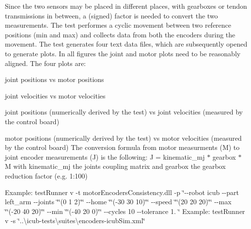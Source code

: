 Since the two sensors may be placed in different places, with gearboxes or tendon transmissions in between, a (signed) factor is needed to convert the two measurements. The test performes a cyclic movement between two reference positions (min and max) and collects data from both the encoders during the movement. The test generates four text data files, which are subsequently opened to generate plots. In all figures the joint and motor plots need to be reasonably aligned. The four plots are\+: \begin{DoxyItemize}
\item joint positions vs motor positions \item joint velocities vs motor velocities \item joint positions (numerically derived by the test) vs joint velocities (measured by the control board) \item motor positions (numerically derived by the test) vs motor velocities (measured by the control board) The conversion formula from motor measurments (M) to joint encoder measurements (J) is the following\+: J = kinematic\+\_\+mj $\ast$ gearbox $\ast$ M with kinematic\+\_\+mj the joints coupling matrix and gearbox the gearbox reduction factor (e.\+g. 1\+:100)\end{DoxyItemize}
Example\+: test\+Runner v -\/t motor\+Encoders\+Consistency.\+dll -\/p \char`\"{}-\/-\/robot icub -\/-\/part left\+\_\+arm -\/-\/joints \char`\"{}\char`\"{}(0 1 2)\char`\"{}\char`\"{} -\/-\/home \char`\"{}\char`\"{}(-\/30 30 10)\char`\"{}\char`\"{} -\/-\/speed \char`\"{}\char`\"{}(20 20 20)\char`\"{}\char`\"{} -\/-\/max \char`\"{}\char`\"{}(-\/20 40 20)\char`\"{}\char`\"{} -\/-\/min \char`\"{}\char`\"{}(-\/40 20 0)\char`\"{}\char`\"{} -\/-\/cycles 10 -\/-\/tolerance 1. \char`\"{} Example\+: test\+Runner v -\/s \char`\"{}..\textbackslash{}icub-\/tests\textbackslash{}suites\textbackslash{}encoders-\/icub\+Sim.\+xml\char`\"{}

